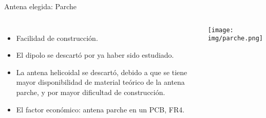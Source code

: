 \begin{frame}{Antena elegida: Parche}

\begin{columns}
        \begin{itemize}[<+->]
            \item Facilidad de construcción.
            \item El dipolo se descartó por ya haber sido estudiado.
            \item La antena helicoidal se descartó, debido a que se tiene mayor disponibilidad de material teórico de la antena parche, y por mayor dificultad de construcción.
            \item El factor económico: antena parche en un PCB, FR4.
        \end{itemize}
            \texttt{[image: img/parche.png]}
\end{columns}
\end{frame}

